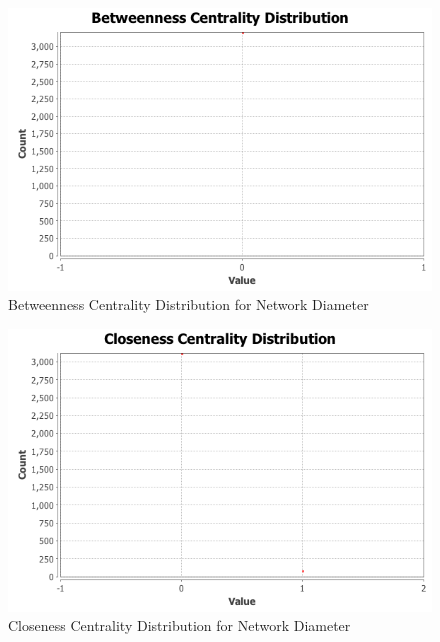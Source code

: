 \begin{figure}[!ht]    
    \begin{center}
        \includegraphics[scale=0.60]{q3/NetworkDiameter/BetweennessCentralityDistribution.png}
        \caption{Betweenness Centrality Distribution for Network Diameter}
        \label{fig:q3-10}
    \end{center}
\end{figure}
\begin{figure}[!ht]    
    \begin{center}
        \includegraphics[scale=0.60]{q3/NetworkDiameter/ClosenessCentralityDistribution.png}
        \caption{Closeness Centrality Distribution for Network Diameter}
        \label{fig:q3-11}
    \end{center}
\end{figure}
